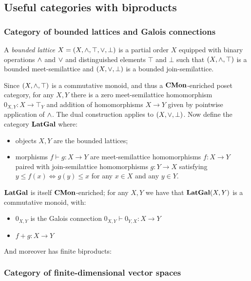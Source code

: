 \subsection{Useful categories with biproducts}
\label{sec:categories-with-biproducts}

\subsubsection{Category of bounded lattices and Galois connections}
\label{sec:categories-with-biproducts:latgal}

\begin{definition}
A \emph{bounded lattice} $X = (X, \wedge, \top, \vee, \bot)$ is a partial order $X$ equipped with binary
operations $\wedge$ and $\vee$ and distinguished elements $\top$ and $\bot$ such that $(X, \wedge, \top)$ is a
bounded meet-semilattice and $(X, \vee, \bot)$ is a bounded join-semilattice.
\end{definition}

\noindent Since $(X, \wedge, \top)$ is a commutative monoid, and thus a $\mathbf{CMon}$-enriched poset category, for
any $X, Y$ there is a zero meet-semilattice homomorphism $0_{X,Y}: X \to \top_Y$ and addition of homomorphisms
$X \to Y$ given by pointwise application of $\wedge$. The dual construction applies to $(X, \vee, \bot)$. Now
define the category $\mathbf{LatGal}$ where:
\begin{itemize}
\item objects $X, Y$ are the bounded lattices;
\item morphisms $f \vdash g: X \to Y$ are meet-semilattice homomorphisms $f: X \to Y$ paired with
join-semilattice homomorphisms $g: Y \to X$ satisfying $y \leq f(x) \iff g(y) \leq x$ for any $x \in X$ and any
$y \in Y$.
\end{itemize}

\noindent $\mathbf{LatGal}$ is itself $\mathbf{CMon}$-enriched; for any $X, Y$ we have that $\mathbf{LatGal}(X,Y)$ is a commutative
monoid, with:
\begin{itemize}
\item $0_{X,Y}$ is the Galois connection $0_{X,Y} \vdash 0_{Y,X}: X \to Y$
\item $f + g: X \to Y$
\end{itemize}

\noindent And moreover has finite biproducts:

\subsubsection{Category of finite-dimensional vector spaces}
\label{sec:categories-with-biproducts:fdvect}

%
